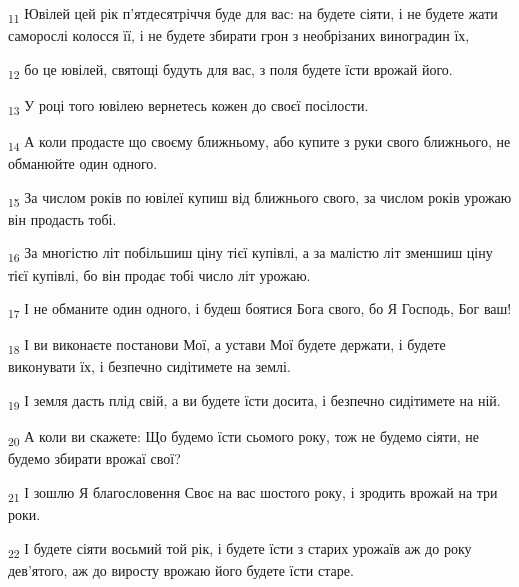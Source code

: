 \begin{tcolorbox}
\textsubscript{11} Ювілей цей рік п'ятдесятріччя буде для вас: на будете сіяти, і не будете жати саморослі колосся її, і не будете збирати грон з необрізаних виноградин їх,
\end{tcolorbox}
\begin{tcolorbox}
\textsubscript{12} бо це ювілей, святощі будуть для вас, з поля будете їсти врожай його.
\end{tcolorbox}
\begin{tcolorbox}
\textsubscript{13} У році того ювілею вернетесь кожен до своєї посілости.
\end{tcolorbox}
\begin{tcolorbox}
\textsubscript{14} А коли продасте що своєму ближньому, або купите з руки свого ближнього, не обманюйте один одного.
\end{tcolorbox}
\begin{tcolorbox}
\textsubscript{15} За числом років по ювілеї купиш від ближнього свого, за числом років урожаю він продасть тобі.
\end{tcolorbox}
\begin{tcolorbox}
\textsubscript{16} За многістю літ побільшиш ціну тієї купівлі, а за малістю літ зменшиш ціну тієї купівлі, бо він продає тобі число літ урожаю.
\end{tcolorbox}
\begin{tcolorbox}
\textsubscript{17} І не обманите один одного, і будеш боятися Бога свого, бо Я Господь, Бог ваш!
\end{tcolorbox}
\begin{tcolorbox}
\textsubscript{18} І ви виконаєте постанови Мої, а устави Мої будете держати, і будете виконувати їх, і безпечно сидітимете на землі.
\end{tcolorbox}
\begin{tcolorbox}
\textsubscript{19} І земля дасть плід свій, а ви будете їсти досита, і безпечно сидітимете на ній.
\end{tcolorbox}
\begin{tcolorbox}
\textsubscript{20} А коли ви скажете: Що будемо їсти сьомого року, тож не будемо сіяти, не будемо збирати врожаї свої?
\end{tcolorbox}
\begin{tcolorbox}
\textsubscript{21} І зошлю Я благословення Своє на вас шостого року, і зродить врожай на три роки.
\end{tcolorbox}
\begin{tcolorbox}
\textsubscript{22} І будете сіяти восьмий той рік, і будете їсти з старих урожаїв аж до року дев'ятого, аж до виросту врожаю його будете їсти старе.
\end{tcolorbox}
